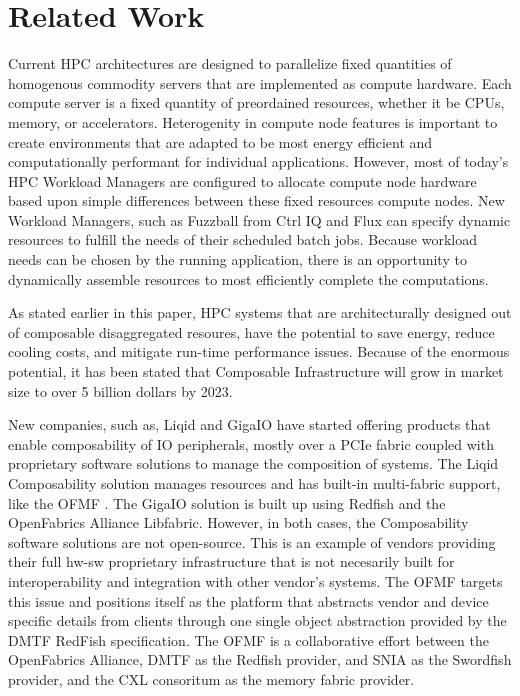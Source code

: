\section{Related Work}
Current HPC architectures are designed to parallelize fixed quantities of homogenous commodity servers that are implemented as compute hardware.  Each compute server is a fixed quantity of preordained resources, whether it be CPUs, memory, or accelerators.  Heterogenity in compute node features is important to create environments that are adapted to be most energy efficient and computationally performant for individual applications.  However, most of today's HPC Workload Managers are configured to allocate compute node hardware based upon simple differences between these fixed resources compute nodes.  New Workload Managers, such as Fuzzball from Ctrl IQ \cite{fuzzball} and Flux \cite{flux} can specify dynamic resources to fulfill the needs of their scheduled batch jobs. Because workload needs can be chosen by the running application, there is an opportunity to dynamically assemble resources to most efficiently complete the computations.
 
As stated earlier in this paper, HPC systems that are architecturally designed out of composable disaggregated resoures, have the potential to save energy, reduce cooling costs, and mitigate run-time performance issues. Because of the enormous potential, it has been stated that Composable Infrastructure will grow in market size to over 5 billion dollars by 2023\cite{rlinker}.

New companies, such as, Liqid \cite{liqid} and GigaIO \cite{gigaio}  have started offering products that enable composability of IO peripherals, mostly over a PCIe fabric coupled with proprietary software solutions to manage the composition of systems. The Liqid Composability solution manages resources and has built-in multi-fabric support, like the OFMF \cite{liqidmf}. The GigaIO solution is built up using Redfish and the OpenFabrics Alliance Libfabric.  However, in both cases, the Composability software solutions are not open-source. This is an example of vendors providing their full hw-sw proprietary infrastructure that is not necesarily built for interoperability and integration with other vendor's systems.
The OFMF targets this issue and positions itself as the platform that abstracts vendor and device specific details from clients through one single object abstraction provided by the DMTF RedFish specification. The OFMF is a collaborative effort between the OpenFabrics Alliance, DMTF as the Redfish provider, and SNIA as the Swordfish provider, and the CXL consoritum as the memory fabric provider.








 
